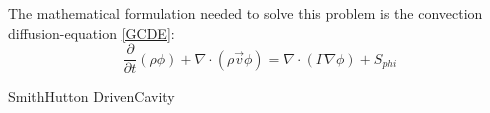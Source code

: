 The mathematical formulation needed to solve this problem is the convection diffusion-equation \ref{GCDE}:
\begin{equation}
\frac{\partial}{\partial t}\left(\rho\phi\right)+\nabla\cdot\left(\rho\vec{v}\phi\right)=\nabla\cdot\left(\Gamma\nabla\phi\right)+S_{phi}
\label{GCDE}
\end{equation}

{SmithHutton}
{DrivenCavity}